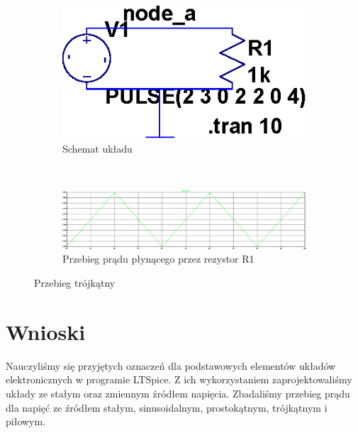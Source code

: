 \documentclass[polish,polish,a4paper]{article}
\begin{document}
\begin{figure}[H]
    \centering
    
    \begin{subfigure}[b]{0.28\textwidth}
    	\centering
        \includegraphics[width=\textwidth]{Drafttrojkatnyuklad.eps}
        \caption{Schemat układu}
    \end{subfigure}
    ~
     \begin{subfigure}[b]{0.4\textwidth}
     	\centering
         \includegraphics[width=\textwidth]{Drafttrojkatny.eps}
         \caption{Przebieg prądu płynącego przez rezystor R1}
     \end{subfigure}
     \caption{Przebieg trójkątny}
\end{figure}







\section{Wnioski}
Nauczyliśmy się przyjętych oznaczeń dla podstawowych elementów układów elektronicznych w programie LTSpice. Z ich wykorzystaniem zaprojektowaliśmy układy ze stałym oraz zmiennym źródłem napięcia. Zbadaliśmy przebieg prądu dla napięć ze źródłem stałym, sinusoidalnym, prostokątnym, trójkątnym i piłowym.



\end{document}
